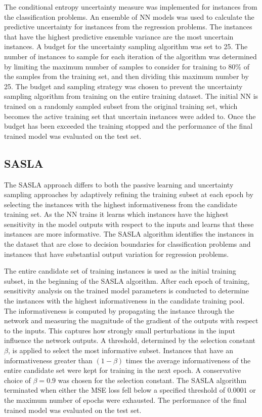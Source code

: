 \documentclass[conference]{IEEEtran}
\begin{document}
	The conditional entropy uncertainty measure was implemented for instances from the classification problems. An ensemble of NN models was used to calculate the predictive uncertainty for instances from the regression problems. The instances that have the highest predictive ensemble variance are the most uncertain instances. A budget for the uncertainty sampling algorithm was set to 25. The number of instances to sample for each iteration of the algorithm was determined by limiting the maximum number of samples to consider for training to 80\% of the samples from the training set, and then dividing this maximum number by 25. The budget and sampling strategy was chosen to prevent the uncertainty sampling algorithm from training on the entire training dataset. The initial NN is trained on a randomly sampled subset from the original training set, which becomes the active training set that uncertain instances were added to. Once the budget has been exceeded the training stopped and the performance of the final trained model was evaluated on the test set.
	
	\subsection{SASLA}
	The SASLA approach differs to both the passive learning and uncertainty sampling approaches by adaptively refining the training subset at each epoch by selecting the instances with the highest informativeness from the candidate training set. As the NN trains it learns which instances have the highest sensitivity in the model outputs with respect to the inputs and learns that these instances are more informative. The SASLA algorithm identifies the instances in the dataset that are close to decision boundaries for classification problems and instances that have substantial output variation for regression problems.
	
	The entire candidate set of training instances is used as the initial training subset, in the beginning of the SASLA algorithm. After each epoch of training, sensitivity analysis on the trained model parameters is conducted to determine the instances with the highest informativeness in the candidate training pool. The informativeness is computed by propagating the instance through the network and measuring the magnitude of the gradient of the outputs with respect to the inputs. This captures how strongly small perturbations in the input influence the network outputs. A threshold, determined by the selection constant $\beta$, is applied to select the most informative subset. Instances that have an informativeness greater than $(1-\beta)$ times the average informativeness of the entire candidate set were kept for training in the next epoch. A conservative choice of $\beta=0.9$ was chosen for the selection constant. The SASLA algorithm terminated when either the MSE loss fell below a specified threshold of $0.0001$ or the maximum number of epochs were exhausted. The performance of the final trained model was evaluated on the test set.
	
\end{document}

